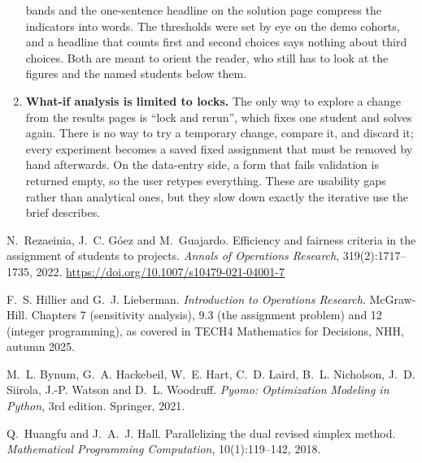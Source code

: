 \documentclass[11pt,a4paper]{article}
\begin{document}
\begin{enumerate}
        bands and the one-sentence headline on the solution page compress
        the indicators into words. The thresholds were set by eye on the
        demo cohorts, and a headline that counts first and second choices
        says nothing about third choices. Both are meant to orient the
        reader, who still has to look at the figures and the named students
        below them.
  \item \textbf{What-if analysis is limited to locks.} The only way to
        explore a change from the results pages is ``lock and rerun'', which
        fixes one student and solves again. There is no way to try a
        temporary change, compare it, and discard it; every experiment
        becomes a saved fixed assignment that must be removed by hand
        afterwards. On the data-entry side, a form that fails validation is
        returned empty, so the user retypes everything. These are usability
        gaps rather than analytical ones, but they slow down exactly the
        iterative use the brief describes.
\end{enumerate}

\begin{thebibliography}{9}
N.~Rezaeinia, J.~C. G\'oez and M.~Guajardo.
\newblock Efficiency and fairness criteria in the assignment of students to
  projects.
\newblock \emph{Annals of Operations Research}, 319(2):1717--1735, 2022.
\newblock \url{https://doi.org/10.1007/s10479-021-04001-7}

F.~S. Hillier and G.~J. Lieberman.
\newblock \emph{Introduction to Operations Research}.
\newblock McGraw-Hill. Chapters 7 (sensitivity analysis), 9.3 (the
  assignment problem) and 12 (integer programming), as covered in TECH4
  Mathematics for Decisions, NHH, autumn 2025.

M.~L. Bynum, G.~A. Hackebeil, W.~E. Hart, C.~D. Laird, B.~L. Nicholson,
  J.~D. Siirola, J.-P. Watson and D.~L. Woodruff.
\newblock \emph{Pyomo: Optimization Modeling in Python}, 3rd edition.
\newblock Springer, 2021.

Q.~Huangfu and J.~A.~J. Hall.
\newblock Parallelizing the dual revised simplex method.
\newblock \emph{Mathematical Programming Computation}, 10(1):119--142, 2018.
\end{thebibliography}
\end{document}

